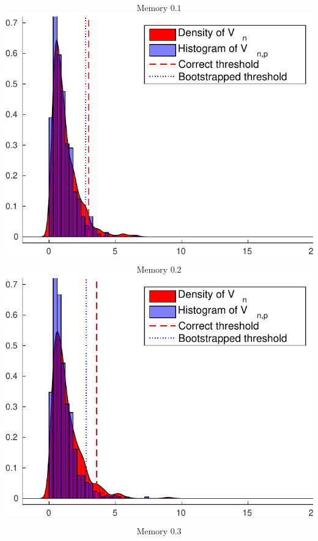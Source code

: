 \documentclass[landscape,a0]{a0poster_csml_v2}
\begin{document}
\begin{poster}
\begin{PosterColumn}
\begin{minipage}[c]{0.24\textwidth}
$$\text{Memory } 0.1$$
\includegraphics[width=\textwidth]{../img/permfail_ecdf1.pdf} 
\end{minipage}
\begin{minipage}[c]{0.24\textwidth}
$$\text{Memory }0.2$$
\includegraphics[width=\textwidth]{../img/permfail_ecdf2.pdf} 
\end{minipage}
\begin{minipage}[c]{0.24\textwidth}
$$\text{Memory }0.3$$

\end{minipage}
\end{PosterColumn}
\end{poster}
\end{document}
